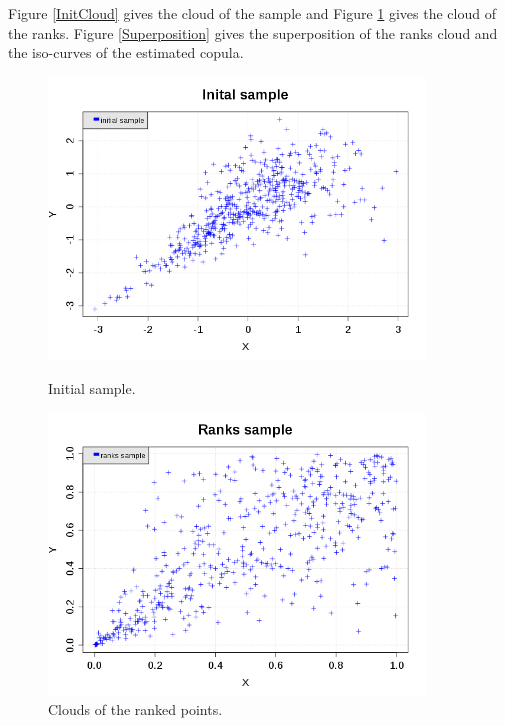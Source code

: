 Figure \ref{InitCloud} gives the cloud of the sample and Figure \ref{RankCloud} gives the cloud of the ranks. Figure \ref{Superposition} gives the superposition of the ranks cloud and the iso-curves of the estimated copula.



\begin{figure}[H]
  \begin{minipage}{10cm}
    \begin{center}
      \includegraphics[width=10cm]{initSample.png}
    \end{center}
    \caption{Initial sample.}
    \label{InitCloud}
  \end{minipage}
  \hfill
  \begin{minipage}{10cm}
    \begin{center}
      \includegraphics[width=10cm]{ranksSample.png}
    \end{center}
    \caption{Clouds of the ranked points.}
    \label{RankCloud}
  \end{minipage}
\end{figure}


